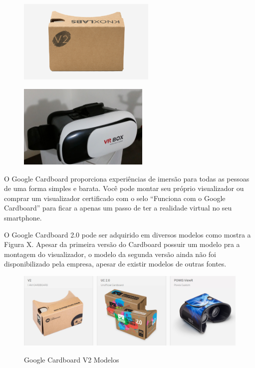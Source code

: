 \begin{figure}[H]
	
	\begin{minipage}{.5\textwidth}{
			\centering
			\includegraphics[height=4cm]{Imagens/googlecardboard.png}		
			\label{f.googlecardboard}	
		}
	\end{minipage}
	\begin{minipage}{.5\textwidth}{
			\centering
			\includegraphics[height=4cm]{Imagens/vrbox.jpg}		
			\label{f.vrbox}
		}
	\end{minipage}
	
\end{figure}


O Google Cardboard proporciona experiências de imersão para todas as pessoas de uma forma simples e barata. Você pode montar seu próprio visualizador ou comprar um visualizador certificado com o selo “Funciona com o Google Cardboard” para ficar a apenas um passo de ter a realidade virtual no seu smartphone. \cite{googlecardboard}

O Google Cardboard 2.0 pode ser adquirido em diversos modelos como mostra a Figura X. Apesar da primeira versão do Cardboard possuir um modelo pra a montagem do visualizador, o modelo da segunda versão ainda não foi disponibilizado pela empresa, apesar de existir modelos de outras fontes.

\begin{figure}[h]
	\caption{\small Google Cardboard V2 Modelos}
	\centering
	\includegraphics[scale=0.5]{Imagens/modelos.png}
	\label{f.modelos}
\end{figure}

